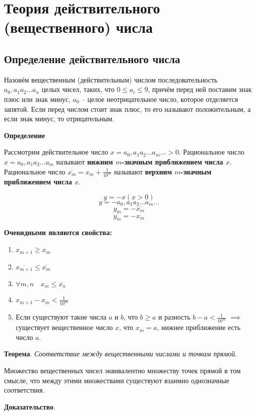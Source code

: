 \documentclass{article}
\newcommand{\parspace}{\vspace{10pt}}
\begin{document}
\section{Теория действительного (вещественного) числа}
\subsection{Определение действительного числа}
Назовём вещественным (действительным) числом последовательность
$a_0,a_1 a_2 \dots a_n$ целых чисел, таких, что $0 \le a_i \le 9$,
причём перед ней поставим знак плюс или знак минус,
$a_0$ -- целое неотрицательное число, которое отделяется запятой.
Если перед числом стоит знак плюс, то его называют положительным,
а если знак минус, то отрицательным.

\textbf{Определение}

Рассмотрим действительное число $x = a_0,a_1 a_2 \dots a_m \dots > 0$.
Рациональное число $x = a_0,a_1 a_2 \dots a_m$ называют
\textbf{нижним $m$-значным приближением числа $x$}.
Рациональное число $\overline{x_m} = x_m + \frac{1}{10^m}$ называют
\textbf{верхним $m$-значным приближением числа $x$}.

\[y = -x (x > 0)\]
\[y = -a_0,a_1 a_2 \dots a_m \dots\]
\[y_m = -\overline{x_m}\]
\[\overline{y_m} = -x_m\]

\textbf{Очевидными являются свойства:}
\begin{enumerate}
    \item $x_{m+1} \ge x_m$
    \item $\overline{x_{m+1}} \le \overline{x_m}$
    \item $\forall m,n \quad x_m \le \overline{x_n}$
    \item $x_{m+1} - x_m < \frac{1}{10^m}$
    \item Если существуют такие числа $a$ и $b$, что $b \ge a$
    и разность $b - a < \frac{1}{10^m}$ $\implies$ существует
    вещественное число $x$, что $x_m = a$, нижнее приближение есть число $a$.
\end{enumerate}

\parspace

\textbf{Теорема}. \textit{Соответствие между вещественными числами и точкам прямой}.

Множество вещественных чисел эквивалентно множеству точек прямой в том смысле, что
между этими множествами существуют взаимно однозначные соответствия.

\textbf{Доказательство}.
\end{document}
